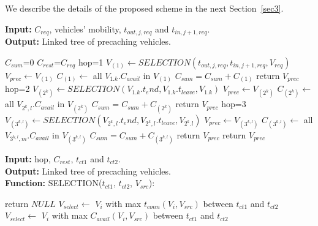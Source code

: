 \documentclass[electronics,aricle,accept,pdftex,moreauthors]{Definitions/mdpi}
\begin{document}
We describe the details of the proposed scheme in the next Section~\ref{sec3}.


\begin{algorithm}[H]
    \caption{Multi-hop precaching vehicle~selection} \label{algo.2}
    \textbf{Input: } $C_{req}$, vehicles' mobility, $t_{out,j,req}$ and $t_{in,j+1,req}$.\\
    \textbf{Output: } Linked tree of precaching vehicles.
    \begin{algorithmic}[1]
        \State $C_{sum}$=0
        \State $C_{rest}$=$C_{req}$
        \State hop=1
        \State $V_{(1)}\leftarrow SELECTION(t_{out,j,req}, t_{in,j+1,req}, V_{req})$
        \State $V_{prec}\leftarrow V_{(1)}$
        \State $C_{(1)}\leftarrow$ all $V_{1.k}.C_{avail}$ in $V_{(1)}$
        \State $C_{sum}=C_{sum}+C_{(1)}$
            \State return $V_{prec}$
        \EndIf
        \State hop=2
            \State $V_{(2^{k})}\leftarrow SELECTION(V_{1.k}.t_end, V_{1.k}.t_{leave}, V_{1.k})$
            \State $V_{prec}\leftarrow V_{(2^{k})}$
            \State $C_{(2^{k})}\leftarrow$ all $V_{2^{k},l}.C_{avail}$ in $V_{(2^{k})}$
            \State $C_{sum}=C_{sum}+C_{(2^{k})}$
                \State return $V_{prec}$
            \EndIf
        \EndFor
        \State hop=3
                \State $V_{(3^{k,l})}\leftarrow SELECTION(V_{2^{k},l}.t_end, V_{2^{k},l}.t_{leave}, V_{2^{k}.l})$
                \State $V_{prec}\leftarrow V_{(3^{k,l})}$
                \State $C_{(3^{k,l})}\leftarrow$ all $V_{3^{k,l},m}.C_{avail}$ in $V_{(3^{k,l})}$
                \State $C_{sum}=C_{sum}+C_{(3^{k,l})}$
                    \State return $V_{prec}$
                \EndIf
            \EndFor
        \EndFor
        \State return $V_{prec}$
    \end{algorithmic}
\end{algorithm}

\vspace{-12pt}

\begin{algorithm}[H]
    \caption{Multiple precaching vehicle~selection} \label{algo.1}
    \textbf{Input: } hop, $C_{rest}$, $t_{ct1}$ and $t_{ct2}$.\\
    \textbf{Output: } Linked tree of precaching vehicles.\\
    \textbf{Function: } SELECTION($t_{ct1}$, $t_{ct2}$, $V_{src}$):
     \begin{algorithmic}[1]
                \State return $NULL$
            \EndIf
                \State $V_{select} \leftarrow$ $V_{i}$ with max $t_{conn}(V_{i}, V_{src})$ between $t_{ct1}$ and $t_{ct2}$
            \Else
                \State $V_{select} \leftarrow$ $V_{i}$ with max $C_{avail}(V_{i}, V_{src})$ between $t_{ct1}$ and $t_{ct2}$
            \EndIf
    \end{algorithmic}
    
    \end{algorithm}
    
\end{document}
